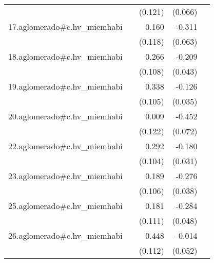 {\begin{longtable}{l*{4}{D{.}{.}{-1}}}
            &                     &     (0.121)         &     (0.066)         &                     \\
\addlinespace
17.aglomerado#c.hv\_miemhabi&                     &       0.160         &      -0.311\sym{***}&                     \\
            &                     &     (0.118)         &     (0.063)         &                     \\
\addlinespace
18.aglomerado#c.hv\_miemhabi&                     &       0.266\sym{*}  &      -0.209\sym{***}&                     \\
            &                     &     (0.108)         &     (0.043)         &                     \\
\addlinespace
19.aglomerado#c.hv\_miemhabi&                     &       0.338\sym{**} &      -0.126\sym{***}&                     \\
            &                     &     (0.105)         &     (0.035)         &                     \\
\addlinespace
20.aglomerado#c.hv\_miemhabi&                     &       0.009         &      -0.452\sym{***}&                     \\
            &                     &     (0.122)         &     (0.072)         &                     \\
\addlinespace
22.aglomerado#c.hv\_miemhabi&                     &       0.292\sym{**} &      -0.180\sym{***}&                     \\
            &                     &     (0.104)         &     (0.031)         &                     \\
\addlinespace
23.aglomerado#c.hv\_miemhabi&                     &       0.189         &      -0.276\sym{***}&                     \\
            &                     &     (0.106)         &     (0.038)         &                     \\
\addlinespace
25.aglomerado#c.hv\_miemhabi&                     &       0.181         &      -0.284\sym{***}&                     \\
            &                     &     (0.111)         &     (0.048)         &                     \\
\addlinespace
26.aglomerado#c.hv\_miemhabi&                     &       0.448\sym{***}&      -0.014         &                     \\
            &                     &     (0.112)         &     (0.052)         &                     \\

\end{longtable}}
